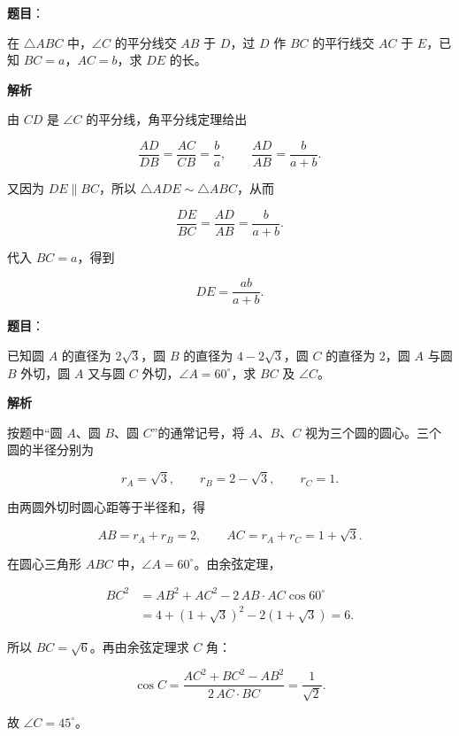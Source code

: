 \begin{answer}

\textbf{题目}：

在 $\triangle ABC$ 中，$\angle C$ 的平分线交 $AB$ 于 $D$，过 $D$ 作 $BC$ 的平行线交 $AC$ 于 $E$，已知 $BC=a$，$AC=b$，求 $DE$ 的长。
\nopagebreak[4]
\begin{center}\end{center}
\nopagebreak[4]
\textbf{解析}

由 $CD$ 是 $\angle C$ 的平分线，角平分线定理给出

\nopagebreak[4]
\[
\frac{AD}{DB}=\frac{AC}{CB}=\frac ba,
\qquad
\frac{AD}{AB}=\frac{b}{a+b}.
\]

又因为 $DE\parallel BC$，所以 $\triangle ADE\sim\triangle ABC$，从而

\nopagebreak[4]
\[
\frac{DE}{BC}=\frac{AD}{AB}=\frac{b}{a+b}.
\]

代入 $BC=a$，得到

\nopagebreak[4]
\[
DE=\frac{ab}{a+b}.
\]


\end{answer}
\begin{answer}

\textbf{题目}：

已知圆 $A$ 的直径为 $2\sqrt3$，圆 $B$ 的直径为 $4-2\sqrt3$，圆 $C$ 的直径为 $2$，圆 $A$ 与圆 $B$ 外切，圆 $A$ 又与圆 $C$ 外切，$\angle A=60^\circ$，求 $BC$ 及 $\angle C$。

\textbf{解析}

按题中“圆 $A$、圆 $B$、圆 $C$”的通常记号，将 $A\text{、}B\text{、}C$ 视为三个圆的圆心。三个圆的半径分别为

\nopagebreak[4]
\[
r_A=\sqrt3,\qquad r_B=2-\sqrt3,\qquad r_C=1.
\]

由两圆外切时圆心距等于半径和，得

\nopagebreak[4]
\[
AB=r_A+r_B=2,
\qquad AC=r_A+r_C=1+\sqrt3.
\]

在圆心三角形 $ABC$ 中，$\angle A=60^\circ$。由余弦定理，

\nopagebreak[4]
\[
\begin{aligned}
BC^2
&=AB^2+AC^2-2\,AB\cdot AC\cos60^\circ\\
&=4+(1+\sqrt3)^2-2(1+\sqrt3)=6.
\end{aligned}
\]

所以 $BC=\sqrt6$。再由余弦定理求 $C$ 角：

\nopagebreak[4]
\[
\cos C
=\frac{AC^2+BC^2-AB^2}{2\,AC\cdot BC}
=\frac1{\sqrt2}.
\]

故 $\angle C=45^\circ$。


\end{answer}
